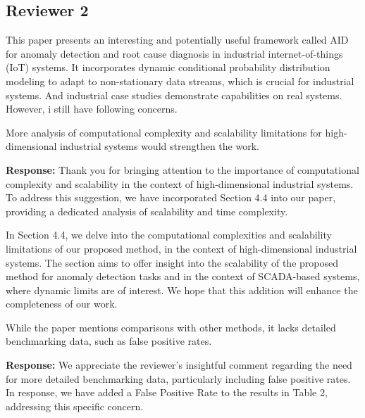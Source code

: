 \documentclass{article}
\makeatletter
\newenvironment{comment}{
\begin{sloppypar}\slshape
\vspace{5 mm}
\color{blue}
 \@beginparpenalty\@M
  \begin{list}{}{\setlength{\topsep}{0ex}%
  \setlength{\leftmargin}{\rightmargin}}\item[]
 \@beginparpenalty\@endparpenalty
}
{\end{list}
\end{sloppypar}
}
\makeatother
\begin{document}
\subsection*{Reviewer 2}
\begin{comment}
This paper presents an interesting and potentially useful framework called AID for anomaly detection and root cause diagnosis in industrial internet-of-things (IoT) systems. It incorporates dynamic conditional probability distribution modeling to adapt to non-stationary data streams, which is crucial for industrial systems. And industrial case studies demonstrate capabilities on real systems. However, i still have following concerns.
\end{comment}

\begin{enumerate}
  \item
        \begin{comment}
        More analysis of computational complexity and scalability limitations for high-dimensional industrial systems would strengthen the work.
        \end{comment}
        {\bf Response:}
        Thank you for bringing attention to the importance of computational complexity and scalability in the context of high-dimensional industrial systems. To address this suggestion, we have incorporated Section 4.4 into our paper, providing a dedicated analysis of scalability and time complexity.

        In Section 4.4, we delve into the computational complexities and scalability limitations of our proposed method, in the context of high-dimensional industrial systems. The section aims to offer insight into the scalability of the proposed method for anomaly detection tasks and in the context of SCADA-based systems, where dynamic limits are of interest. We hope that this addition will enhance the completeness of our work.

  \item
        \begin{comment}
        While the paper mentions comparisons with other methods, it lacks detailed benchmarking data, such as false positive rates.
        \end{comment}
        {\bf Response:}
        We appreciate the reviewer's insightful comment regarding the need for more detailed benchmarking data, particularly including false positive rates. In response, we have added a False Positive Rate to the results in Table 2, addressing this specific concern.


\end{enumerate}
\end{document}
